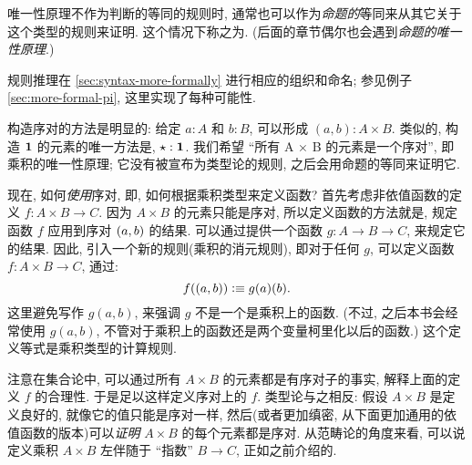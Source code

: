 \begin{rmk}
\begin{enumerate}
        唯一性原理不作为判断的等同的规则时, 通常也可以作为\emph{命题的}等同来从其它关于这个类型的规则来证明.
        这个情况下称之为.
        (后面的章节偶尔也会遇到\emph{命题的唯一性原理}.)
    \end{enumerate}
    规则推理在 \cref{sec:syntax-more-formally} 进行相应的组织和命名;
    参见例子 \cref{sec:more-formal-pi}, 这里实现了每种可能性.
\end{rmk}

构造序对的方法是明显的: 给定 $a:A$ 和 $b:B$, 可以形成 $(a,b):A\times B$.
类似的, 构造 $\mathbf{1}$ 的元素的唯一方法是, $\star:\mathbf{1}$.
我们希望 ``所有 A × B 的元素是一个序对'', 即乘积的唯一性原理;
它没有被宣布为类型论的规则, 之后会用命题的等同来证明它.

现在, 如何\emph{使用}序对, 即, 如何根据乘积类型来定义函数?
首先考虑非依值函数的定义 $f : A\times B \to C$.
因为 $A\times B$ 的元素只能是序对, 所以定义函数的方法就是, 规定函数 $f$ 应用到序对 $(a,b)$ 的结果.
可以通过提供一个函数 $g : A \to B \to C$, 来规定它的结果.
因此, 引入一个新的规则(乘积的消元规则), 即对于任何 $g$, 可以定义函数 $f : A\times B \to C$, 通过:
\[
    f((a,b)) \vcentcolon\equiv g(a)(b).
\]
这里避免写作 $g(a,b)$, 来强调 $g$ 不是一个是乘积上的函数.
(不过, 之后本书会经常使用 $g(a,b)$, 不管对于乘积上的函数还是两个变量柯里化以后的函数.)
这个定义等式是乘积类型的计算规则.

注意在集合论中, 可以通过所有 $A\times B$ 的元素都是有序对子的事实, 解释上面的定义 $f$ 的合理性.
于是足以这样定义序对上的 $f$.
类型论与之相反: 假设 $A\times B$ 是定义良好的, 就像它的值只能是序对一样, 然后(或者更加缜密, 从下面更加通用的依值函数的版本)可以\emph{证明} $A\times B$ 的每个元素都是序对.
从范畴论的角度来看, 可以说定义乘积 $A\times B$ 左伴随于 ``指数'' $B\to C$, 正如之前介绍的.


